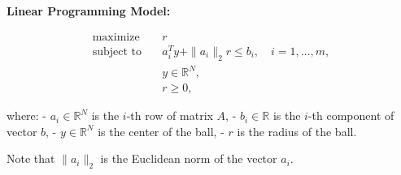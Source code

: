 \documentclass{article}
\begin{document}
\textbf{Linear Programming Model:}

\begin{align*}
\text{maximize} \quad & r \\
\text{subject to} \quad & a_i^T y + \|a_i\|_2 r \leq b_i, \quad i = 1, \ldots, m, \\
& y \in \mathbb{R}^N, \\
& r \geq 0,
\end{align*}

where:
- \( a_i \in \mathbb{R}^N \) is the \( i \)-th row of matrix \( A \),
- \( b_i \in \mathbb{R} \) is the \( i \)-th component of vector \( b \),
- \( y \in \mathbb{R}^N \) is the center of the ball,
- \( r \) is the radius of the ball.

Note that \(\|a_i\|_2\) is the Euclidean norm of the vector \( a_i \).
\end{document}
